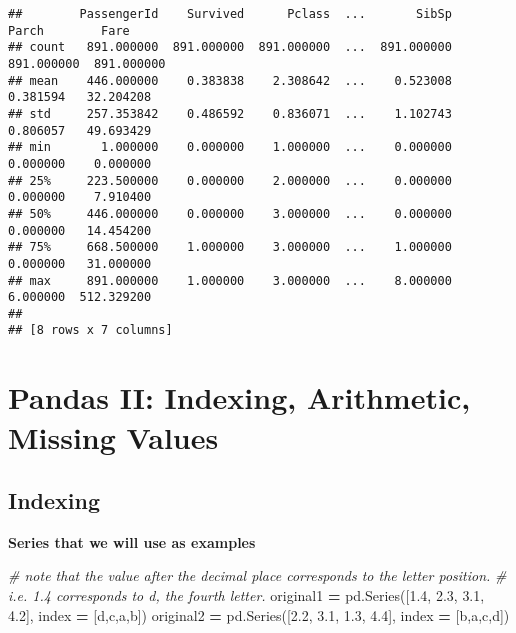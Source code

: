 \documentclass[
]{book}
\newenvironment{Shaded}{\begin{snugshade}}{\end{snugshade}}
\newcommand{\CommentTok}[1]{\textcolor[rgb]{0.56,0.35,0.01}{\textit{#1}}}
\newcommand{\FloatTok}[1]{\textcolor[rgb]{0.00,0.00,0.81}{#1}}
\newcommand{\NormalTok}[1]{#1}
\newcommand{\OperatorTok}[1]{\textcolor[rgb]{0.81,0.36,0.00}{\textbf{#1}}}
\newcommand{\StringTok}[1]{\textcolor[rgb]{0.31,0.60,0.02}{#1}}
\begin{document}
\begin{verbatim}
##        PassengerId    Survived      Pclass  ...       SibSp       Parch        Fare
## count   891.000000  891.000000  891.000000  ...  891.000000  891.000000  891.000000
## mean    446.000000    0.383838    2.308642  ...    0.523008    0.381594   32.204208
## std     257.353842    0.486592    0.836071  ...    1.102743    0.806057   49.693429
## min       1.000000    0.000000    1.000000  ...    0.000000    0.000000    0.000000
## 25%     223.500000    0.000000    2.000000  ...    0.000000    0.000000    7.910400
## 50%     446.000000    0.000000    3.000000  ...    0.000000    0.000000   14.454200
## 75%     668.500000    1.000000    3.000000  ...    1.000000    0.000000   31.000000
## max     891.000000    1.000000    3.000000  ...    8.000000    6.000000  512.329200
## 
## [8 rows x 7 columns]
\end{verbatim}

\hypertarget{pandas-ii-indexing-arithmetic-missing-values}{%
\section{Pandas II: Indexing, Arithmetic, Missing Values}\label{pandas-ii-indexing-arithmetic-missing-values}}

\hypertarget{indexing}{%
\subsection{Indexing}\label{indexing}}

\textbf{Series that we will use as examples}

\begin{Shaded}
\begin{Highlighting}[]
\CommentTok{\# note that the value after the decimal place corresponds to the letter position.}
\CommentTok{\# i.e. 1.4 corresponds to d, the fourth letter.}
\NormalTok{original1 }\OperatorTok{=}\NormalTok{ pd.Series([}\FloatTok{1.4}\NormalTok{, }\FloatTok{2.3}\NormalTok{, }\FloatTok{3.1}\NormalTok{, }\FloatTok{4.2}\NormalTok{], index }\OperatorTok{=}\NormalTok{ [}\StringTok{\textquotesingle{}d\textquotesingle{}}\NormalTok{,}\StringTok{\textquotesingle{}c\textquotesingle{}}\NormalTok{,}\StringTok{\textquotesingle{}a\textquotesingle{}}\NormalTok{,}\StringTok{\textquotesingle{}b\textquotesingle{}}\NormalTok{])}
\NormalTok{original2 }\OperatorTok{=}\NormalTok{ pd.Series([}\FloatTok{2.2}\NormalTok{, }\FloatTok{3.1}\NormalTok{, }\FloatTok{1.3}\NormalTok{, }\FloatTok{4.4}\NormalTok{], index }\OperatorTok{=}\NormalTok{ [}\StringTok{\textquotesingle{}b\textquotesingle{}}\NormalTok{,}\StringTok{\textquotesingle{}a\textquotesingle{}}\NormalTok{,}\StringTok{\textquotesingle{}c\textquotesingle{}}\NormalTok{,}\StringTok{\textquotesingle{}d\textquotesingle{}}\NormalTok{])}
\end{Highlighting}
\end{Shaded}
\end{document}
